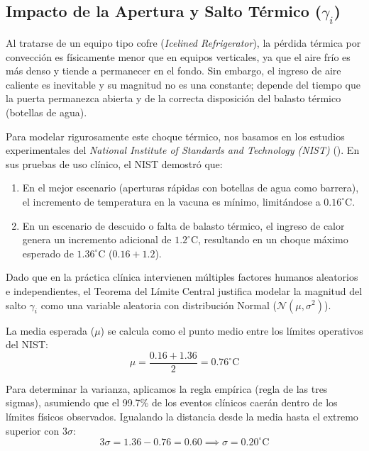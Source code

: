 \documentclass[
  spanish,
  letterpaper,
  DIV=11,
  numbers=noendperiod]{scrreprt}
\providecommand{\tightlist}{%
  \setlength{\itemsep}{0pt}\setlength{\parskip}{0pt}}
\theoremstyle{plain}
\theoremstyle{plain}
\theoremstyle{plain}
\theoremstyle{definition}
\theoremstyle{remark}
\begin{document}
\subsection{\texorpdfstring{Impacto de la Apertura y Salto Térmico
(\(\gamma_i\))}{Impacto de la Apertura y Salto Térmico (\textbackslash gamma\_i)}}\label{sec-salto-termico}

Al tratarse de un equipo tipo cofre (\emph{Icelined Refrigerator}), la
pérdida térmica por convección es físicamente menor que en equipos
verticales, ya que el aire frío es más denso y tiende a permanecer en el
fondo. Sin embargo, el ingreso de aire caliente es inevitable y su
magnitud no es una constante; depende del tiempo que la puerta
permanezca abierta y de la correcta disposición del balasto térmico
(botellas de agua).

Para modelar rigurosamente este choque térmico, nos basamos en los
estudios experimentales del \emph{National Institute of Standards and
Technology (NIST)} (). En sus pruebas de uso clínico, el NIST demostró que:

\begin{enumerate}
\def\labelenumi{\arabic{enumi}.}
\tightlist
\item
  En el mejor escenario (aperturas rápidas con botellas de agua como
  barrera), el incremento de temperatura en la vacuna es mínimo,
  limitándose a \textbf{\(0.16^\circ\text{C}\)}.
\item
  En un escenario de descuido o falta de balasto térmico, el ingreso de
  calor genera un incremento adicional de \(1.2^\circ\text{C}\),
  resultando en un choque máximo esperado de
  \textbf{\(1.36^\circ\text{C}\)} (\(0.16 + 1.2\)).
\end{enumerate}

Dado que en la práctica clínica intervienen múltiples factores humanos
aleatorios e independientes, el Teorema del Límite Central justifica
modelar la magnitud del salto \(\gamma_i\) como una variable aleatoria
con distribución Normal (\(\mathcal{N}(\mu, \sigma^2)\)).

La media esperada (\(\mu\)) se calcula como el punto medio entre los
límites operativos del NIST:
\[\mu = \frac{0.16 + 1.36}{2} = 0.76^\circ\text{C}\]

Para determinar la varianza, aplicamos la regla empírica (regla de las
tres sigmas), asumiendo que el 99.7\% de los eventos clínicos caerán
dentro de los límites físicos observados. Igualando la distancia desde
la media hasta el extremo superior con \(3\sigma\):
\[3\sigma = 1.36 - 0.76 = 0.60 \implies \sigma = 0.20^\circ\text{C}\]
\end{document}
